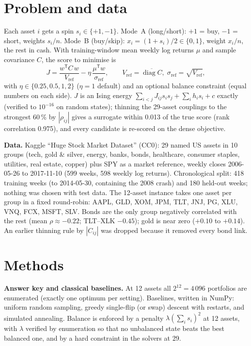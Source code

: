 \documentclass[10pt,twocolumn]{article}
\begin{document}
\section{Problem and data}
Each asset $i$ gets a spin $s_i\in\{+1,-1\}$. Mode~A (long/short): $+1$ = buy, $-1$ = short, weights $s_i/n$. Mode~B (buy/skip): $x_i=(1+s_i)/2\in\{0,1\}$, weight $x_i/n$, the rest in cash. With training-window mean weekly log returns $\mu$ and sample covariance $C$, the score to minimise is
\begin{equation}
J = \frac{w^{\mathsf T} C\, w}{V_{\mathrm{ref}}} - \eta\,\frac{\mu^{\mathsf T} w}{\sigma_{\mathrm{ref}}},\qquad V_{\mathrm{ref}}=\overline{\operatorname{diag} C},\; \sigma_{\mathrm{ref}}=\sqrt{V_{\mathrm{ref}}},
\end{equation}
with $\eta\in\{0.25,0.5,1,2\}$ ($\eta=1$ default) and an optional balance constraint (equal numbers on each side). $J$ is an Ising energy $\sum_{i<j}J_{ij}s_is_j+\sum_i h_i s_i+c$ exactly (verified to $10^{-16}$ on random states); thinning the 29-asset couplings to the strongest 60\,\% by $|\rho_{ij}|$ gives a surrogate within 0.013 of the true score (rank correlation 0.975), and every candidate is re-scored on the dense objective.

\textbf{Data.} Kaggle ``Huge Stock Market Dataset'' (CC0): 29 named US assets in 10 groups (tech, gold \& silver, energy, banks, bonds, healthcare, consumer staples, utilities, real estate, copper) plus SPY as a market reference, weekly closes 2006-05-26 to 2017-11-10 (599 weeks, 598 weekly log returns). Chronological split: 418 training weeks (to 2014-05-30, containing the 2008 crash) and 180 held-out weeks; nothing was chosen with test data. The 12-asset instance takes one asset per group in a fixed round-robin: AAPL, GLD, XOM, JPM, TLT, JNJ, PG, XLU, VNQ, FCX, MSFT, SLV. Bonds are the only group negatively correlated with the rest (mean $\rho\approx-0.22$; TLT--XLK $-0.45$); gold is near zero ($+0.10$ to $+0.14$). An earlier thinning rule by $|C_{ij}|$ was dropped because it removed every bond link.

\section{Methods}
\textbf{Answer key and classical baselines.} At 12 assets all $2^{12}=4\,096$ portfolios are enumerated (exactly one optimum per setting). Baselines, written in NumPy: uniform random sampling, greedy single-flip (or swap) descent with restarts, and simulated annealing. Balance is enforced by a penalty $\lambda(\sum_i s_i)^2$ at 12 assets, with $\lambda$ verified by enumeration so that no unbalanced state beats the best balanced one, and by a hard constraint in the solvers at 29.
\end{document}
